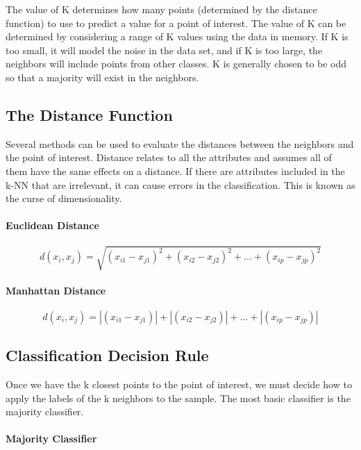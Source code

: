 \documentclass{report}
\begin{document}
The value of K determines how many points (determined by the distance function) to use to predict a value for a point of interest.
The value of K can be determined by considering a range of K values using the data in memory.
If K is too small, it will model the noise in the data set, and if K is too large, the neighbors will include points from other classes.
K is generally chosen to be odd so that a majority will exist in the neighbors.

\subsection*{The Distance Function}

Several methods can be used to evaluate the distances between the neighbors and the point of interest.
Distance relates to all the attributes and assumes all of them have the same effects on a distance.
If there are attributes included in the k-NN that are irrelevant, it can cause errors in the classification.
This is known as the curse of dimensionality. 

\paragraph*{Euclidean Distance}

\begin{equation}
d(x_{i},x_{j}) = \sqrt{(x_{i1} - x_{j1})^2 + (x_{i2} - x_{j2})^2 + ... + (x_{ip} - x_{jp})^2}
\end{equation}

\paragraph*{Manhattan Distance}

\begin{equation}
d(x_{i},x_{j}) = |(x_{i1} - x_{j1})| + |(x_{i2} - x_{j2})| + ... + |(x_{ip} - x_{jp})|
\end{equation}

\subsection*{Classification Decision Rule}

Once we have the k closest points to the point of interest, we must decide how to apply the labels of the k neighbors to the sample.
The most basic classifier is the majority classifier.

\paragraph{Majority Classifier}
\end{document}
